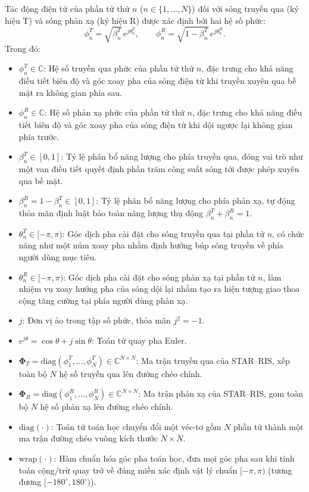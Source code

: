 Tác động điện từ của phần tử thứ $n$ ($n \in \{1, \dots, N\}$) đối với sóng truyền qua (ký hiệu T) và sóng
phản xạ (ký hiệu R) được xác định bởi hai hệ số phức:
\begin{equation}
\phi^T_n = \sqrt{\beta^T_n}\, e^{j\theta^T_n}, \qquad
\phi^R_n = \sqrt{1 - \beta^T_n}\, e^{j\theta^R_n}.
\label{eq:he-so-star}
\end{equation}
Trong đó:
\begin{itemize}
\item $\phi^T_n \in \mathbb{C}$: Hệ số truyền qua phức của phần tử thứ $n$, đặc trưng cho khả năng điều tiết
  biên độ và góc xoay pha của sóng điện từ khi truyền xuyên qua bề mặt ra không gian phía sau.
\item $\phi^R_n \in \mathbb{C}$: Hệ số phản xạ phức của phần tử thứ $n$, đặc trưng cho khả năng điều tiết
  biên độ và góc xoay pha của sóng điện từ khi dội ngược lại không gian phía trước.
\item $\beta^T_n \in [0, 1]$: Tỷ lệ phân bổ năng lượng cho phía truyền qua, đóng vai trò như một van điều
  tiết quyết định phần trăm công suất sóng tới được phép xuyên qua bề mặt.
\item $\beta^R_n = 1 - \beta^T_n \in [0, 1]$: Tỷ lệ phân bổ năng lượng cho phía phản xạ, tự động thỏa mãn
  định luật bảo toàn năng lượng thụ động $\beta^T_n + \beta^R_n = 1$.
\item $\theta^T_n \in [-\pi, \pi)$: Góc dịch pha cài đặt cho sóng truyền qua tại phần tử $n$, có chức năng
  như một núm xoay pha nhằm định hướng búp sóng truyền về phía người dùng mục tiêu.
\item $\theta^R_n \in [-\pi, \pi)$: Góc dịch pha cài đặt cho sóng phản xạ tại phần tử $n$, làm nhiệm vụ xoay
  hướng pha của sóng dội lại nhằm tạo ra hiện tượng giao thoa cộng tăng cường tại phía người dùng phản xạ.
\item $j$: Đơn vị ảo trong tập số phức, thỏa mãn $j^2 = -1$.
\item $e^{j\theta} = \cos\theta + j\sin\theta$: Toán tử quay pha Euler.
\item $\boldsymbol{\Phi}_T = \mathrm{diag}(\phi^T_1, \dots, \phi^T_N) \in \mathbb{C}^{N \times N}$: Ma trận
  truyền qua của STAR--RIS, xếp toàn bộ $N$ hệ số truyền qua lên đường chéo chính.
\item $\boldsymbol{\Phi}_R = \mathrm{diag}(\phi^R_1, \dots, \phi^R_N) \in \mathbb{C}^{N \times N}$: Ma trận
  phản xạ của STAR--RIS, gom toàn bộ $N$ hệ số phản xạ lên đường chéo chính.
\item $\mathrm{diag}(\cdot)$: Toán tử toán học chuyển đổi một véc-tơ gồm $N$ phần tử thành một ma trận đường
  chéo vuông kích thước $N \times N$.
\item $\mathrm{wrap}(\cdot)$: Hàm chuẩn hóa góc pha toán học, đưa mọi góc pha sau khi tính toán cộng/trừ quay
  trở về đúng miền xác định vật lý chuẩn $[-\pi, \pi)$ (tương đương $[-180^\circ, 180^\circ)$).
\end{itemize}

